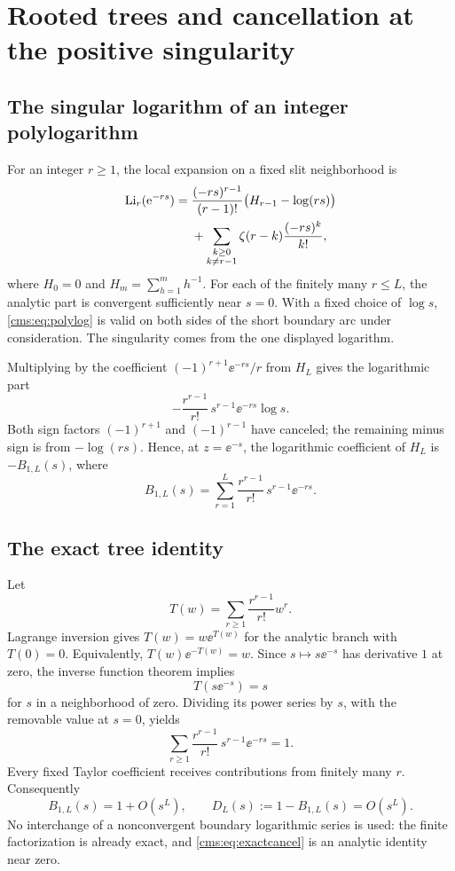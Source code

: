 \section{Rooted trees and cancellation at the positive singularity}\label{cms:sec:positive}
\subsection{The singular logarithm of an integer polylogarithm}
For an integer $r\geq1$, the local expansion on a fixed slit neighborhood is
\begin{align}\label{cms:eq:polylog}
\operatorname{Li}_r(\mathrm e^{-rs})={}&
\frac{(-rs)^{r-1}}{(r-1)!}\bigl(H_{r-1}-\log(rs)\bigr)\\
&+\sum_{\substack{k\geq0\\k\ne r-1}}
 \zeta(r-k)\frac{(-rs)^k}{k!},\notag
\end{align}
where $H_0=0$ and $H_m=\sum_{h=1}^m h^{-1}$. For each of the finitely many $r\leq L$, the analytic part is convergent sufficiently near $s=0$. With a fixed choice of $\log s$, \eqref{cms:eq:polylog} is valid on both sides of the short boundary arc under consideration. The singularity comes from the one displayed logarithm.

Multiplying by the coefficient $(-1)^{r+1}\ee^{-rs}/r$ from $H_L$ gives the logarithmic part
\[
-\frac{r^{r-1}}{r!}\,s^{r-1}\ee^{-rs}\log s.
\]
Both sign factors $(-1)^{r+1}$ and $(-1)^{r-1}$ have canceled; the remaining minus sign is from $-\log(rs)$. Hence, at $z=\ee^{-s}$, the logarithmic coefficient of $H_L$ is $-B_{1,L}(s)$, where
\begin{equation}\label{cms:eq:B1}
B_{1,L}(s)=\sum_{r=1}^{L}\frac{r^{r-1}}{r!}\,
 s^{r-1}\ee^{-rs}.
\end{equation}

\subsection{The exact tree identity}
Let
\begin{equation}\label{cms:eq:tree}
T(w)=\sum_{r\geq1}\frac{r^{r-1}}{r!}w^r.
\end{equation}
Lagrange inversion gives $T(w)=w\ee^{T(w)}$ for the analytic branch with $T(0)=0$. Equivalently, $T(w)\ee^{-T(w)}=w$. Since $s\mapsto s\ee^{-s}$ has derivative $1$ at zero, the inverse function theorem implies
\begin{equation}\label{cms:eq:treeidentity}
T(s\ee^{-s})=s
\end{equation}
for $s$ in a neighborhood of zero. Dividing its power series by $s$, with the removable value at $s=0$, yields
\begin{equation}\label{cms:eq:exactcancel}
\sum_{r\geq1}\frac{r^{r-1}}{r!}\,
 s^{r-1}\ee^{-rs}=1.
\end{equation}
Every fixed Taylor coefficient receives contributions from finitely many $r$. Consequently
\begin{equation}\label{cms:eq:D}
B_{1,L}(s)=1+O(s^L),\qquad D_L(s):=1-B_{1,L}(s)=O(s^L).
\end{equation}
No interchange of a nonconvergent boundary logarithmic series is used: the finite factorization is already exact, and \eqref{cms:eq:exactcancel} is an analytic identity near zero.

